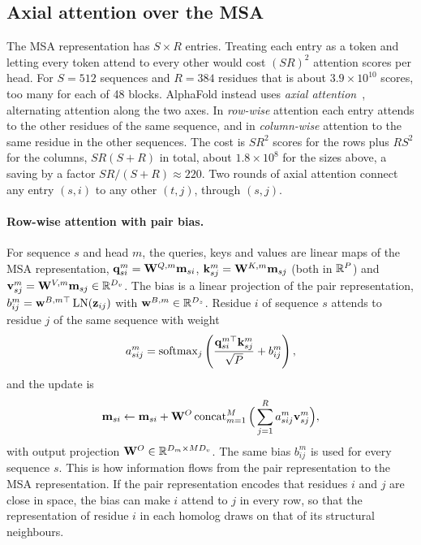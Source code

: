\subsection{Axial attention over the MSA}

The MSA representation has $S\times R$ entries. Treating each entry as a token and letting every token attend to every other would cost $(SR)^2$ attention scores per head. For $S=512$ sequences and $R=384$ residues that is about $3.9\times10^{10}$ scores, too many for each of 48 blocks. AlphaFold instead uses \emph{axial attention}~\citep{ho2019}, alternating attention along the two axes. In \emph{row-wise} attention each entry attends to the other residues of the same sequence, and in \emph{column-wise} attention to the same residue in the other sequences. The cost is $SR^2$ scores for the rows plus $RS^2$ for the columns, $SR(S+R)$ in total, about $1.8\times10^8$ for the sizes above, a saving by a factor $SR/(S+R)\approx 220$. Two rounds of axial attention connect any entry $(s,i)$ to any other $(t,j)$, through $(s,j)$.

\paragraph{Row-wise attention with pair bias.} For sequence $s$ and head $m$, the queries, keys and values are linear maps of the MSA representation, $\mathbf{q}^m_{si}=\mathbf{W}^{Q,m}\mathbf{m}_{si}$, $\mathbf{k}^m_{sj}=\mathbf{W}^{K,m}\mathbf{m}_{sj}$ (both in $\mathbb{R}^P$) and $\mathbf{v}^m_{sj}=\mathbf{W}^{V,m}\mathbf{m}_{sj}\in\mathbb{R}^{D_v}$. The bias is a linear projection of the pair representation, $b^m_{ij}=\mathbf{w}^{B,m\top}\operatorname{LN}(\mathbf{z}_{ij})$ with $\mathbf{w}^{B,m}\in\mathbb{R}^{D_z}$. Residue $i$ of sequence $s$ attends to residue $j$ of the same sequence with weight
\begin{equation}
  a^m_{sij} = \operatorname{softmax}_j\left(\frac{\mathbf{q}^{m\top}_{si}\mathbf{k}^m_{sj}}{\sqrt{P}} + b^m_{ij}\right),
  \label{eq:row_attention}
\end{equation}
and the update is
\begin{equation}
  \mathbf{m}_{si} \leftarrow \mathbf{m}_{si} + \mathbf{W}^O\operatorname{concat}_{m=1}^{M}\Big(\sum_{j=1}^R a^m_{sij}\mathbf{v}^m_{sj}\Big),
\end{equation}
with output projection $\mathbf{W}^O\in\mathbb{R}^{D_m\times MD_v}$. The same bias $b^m_{ij}$ is used for every sequence $s$. This is how information flows from the pair representation to the MSA representation. If the pair representation encodes that residues $i$ and $j$ are close in space, the bias can make $i$ attend to $j$ in every row, so that the representation of residue $i$ in each homolog draws on that of its structural neighbours.

